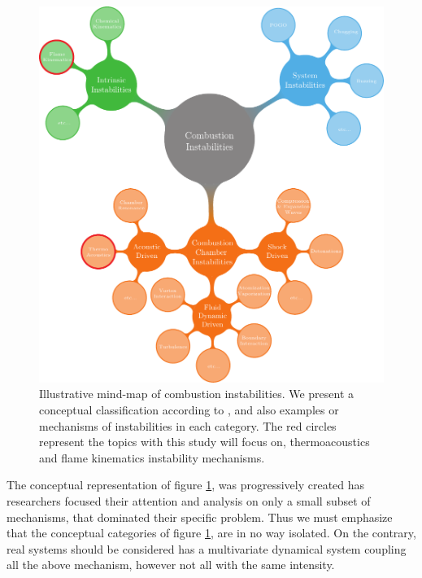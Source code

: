 \begin{figure}[!htb]
	\begin{center}
	\includegraphics[scale=1.02]{./img/mindmap}
	\end{center}
	\caption{Illustrative mind-map of combustion instabilities. We present a conceptual classification according to \cite{barrere}, and also examples or mechanisms of instabilities in each category. The red circles represent the topics with this study will focus on, thermoacoustics and flame kinematics instability mechanisms. }
	\label{mindmap}
\end{figure}


The conceptual representation of figure \ref{mindmap}, was progressively created has researchers focused their attention and analysis on only a small subset of mechanisms, that dominated their specific problem.
Thus we must emphasize that the conceptual categories of figure \ref{mindmap}, are in no way isolated.  On the contrary, real systems should be considered has a multivariate dynamical system coupling all the above mechanism, however not all with the same intensity.

